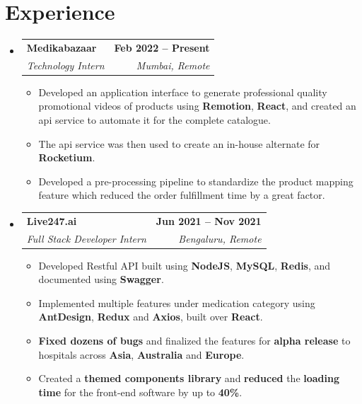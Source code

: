\documentclass[letterpaper,11pt]{article}
\makeatletter
\newcommand{\resumeItem}[1]{
  \item\small{
    {#1 \vspace{-2pt}}
  }
}
\newcommand{\resumeSubheading}[4]{
  \vspace{-2pt}\item
    \begin{tabular*}{1.0\textwidth}[t]{l@{\extracolsep{\fill}}r}
      \textbf{#1} & \textbf{\small #2} \\
      \textit{\small#3} & \textit{\small #4} \\
    \end{tabular*}\vspace{-7pt}
}
\newcommand{\resumeSubHeadingListStart}{\begin{itemize}[leftmargin=0.0in, label={}]}
\newcommand{\resumeSubHeadingListEnd}{\end{itemize}}
\newcommand{\resumeItemListStart}{\begin{itemize}}
\newcommand{\resumeItemListEnd}{\end{itemize}\vspace{-5pt}}
\makeatother
\begin{document}


\section{Experience}
  \resumeSubHeadingListStart

    \resumeSubheading
      {Medikabazaar}{Feb 2022 -- Present}
      {Technology Intern}{Mumbai, Remote}
      \resumeItemListStart
        \resumeItem{Developed an application interface to generate professional quality promotional videos of products using \textbf{Remotion}, \textbf{React}, and created an api service to automate it for the complete catalogue.}
        \resumeItem{The api service was then used to create an in-house alternate for \textbf{Rocketium}.}
        \resumeItem{Developed a pre-processing pipeline to standardize the product mapping feature which reduced the order fulfillment time by a great factor.}
      \resumeItemListEnd
      
    \resumeSubheading
      {Live247.ai}{Jun 2021 -- Nov 2021}
      {Full Stack Developer Intern}{Bengaluru, Remote}
      \resumeItemListStart
        \resumeItem{Developed Restful API built using \textbf{NodeJS}, \textbf{MySQL}, \textbf{Redis}, and documented using \textbf{Swagger}.}
        \resumeItem{Implemented multiple features under medication category using \textbf{AntDesign}, \textbf{Redux} and \textbf{Axios}, built over \textbf{React}.}
        \resumeItem{\textbf{Fixed dozens of bugs} and finalized the features for \textbf{alpha release} to hospitals across \textbf{Asia}, \textbf{Australia} and \textbf{Europe}.}
        \resumeItem{Created a \textbf{themed components library} and \textbf{reduced} the \textbf{loading time} for the front-end software by up to \textbf{40\%}.}
      \resumeItemListEnd
    \resumeSubHeadingListEnd
\end{document}
